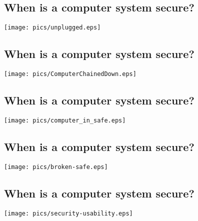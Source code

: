 \documentclass[xga]{xdvislides}
\begin{document}
\subsection{When is a computer system secure?}
\vspace*{\fill}
\begin{center}
	\texttt{[image: pics/unplugged.eps]}
\end{center}
\vspace*{\fill}

\subsection{When is a computer system secure?}
\vspace*{\fill}
\begin{center}
	\texttt{[image: pics/ComputerChainedDown.eps]}
\end{center}
\vspace*{\fill}

\subsection{When is a computer system secure?}
\vspace*{\fill}
\begin{center}
	\texttt{[image: pics/computer\_in\_safe.eps]}
\end{center}
\vspace*{\fill}

\subsection{When is a computer system secure?}
\vspace*{\fill}
\begin{center}
	\texttt{[image: pics/broken-safe.eps]}
\end{center}
\vspace*{\fill}

\subsection{When is a computer system secure?}
\vspace*{\fill}
\begin{center}
	\texttt{[image: pics/security-usability.eps]}
\end{center}
\vspace*{\fill}
\end{document}
